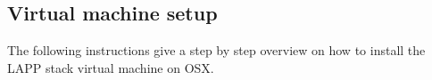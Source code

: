 \subsection{Virtual machine setup}
\label{sec:dbinstvm}
The following instructions give a step by step overview on how to install the LAPP stack virtual machine on OSX.  

